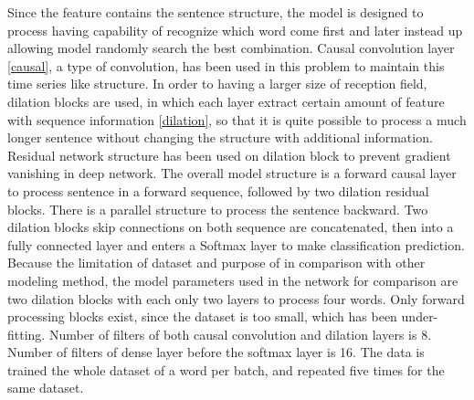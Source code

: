 Since the feature contains the sentence structure, the model is designed to process having capability of recognize which word come first and later instead up allowing model randomly search the best combination. Causal convolution layer \ref{causal}, a type of convolution, has been used in this problem to maintain this time series like structure. In order to having a larger size of reception field, dilation blocks are used, in which each layer extract certain amount of feature with sequence information \ref{dilation}, so that it is quite possible to process a much longer sentence without changing the structure with additional information. Residual network structure has been used on dilation block to prevent gradient vanishing in deep network.
The overall model structure is a forward causal layer to process sentence in a forward sequence, followed by two dilation residual blocks. There is a parallel structure to process the sentence backward. Two dilation blocks skip connections on both sequence are concatenated, then into a fully connected layer and enters a Softmax layer to make classification prediction.
Because the limitation of dataset and purpose of in comparison with other modeling method, the model parameters used in the network for comparison are two dilation blocks with each only two layers to process four words. Only forward processing blocks exist, since the dataset is too small, which has been under-fitting. Number of filters of both causal convolution and dilation layers is 8. Number of filters of dense layer before the softmax layer is 16. The data is trained the whole dataset of a word per batch, and repeated five times for the same dataset.